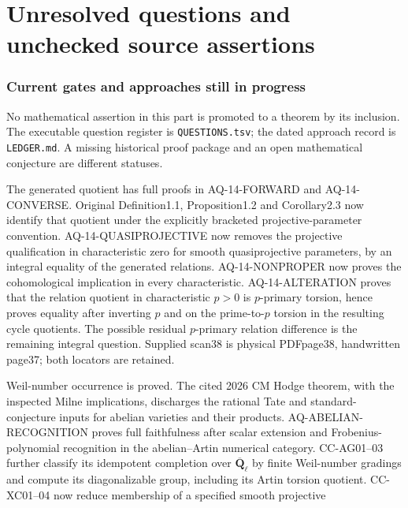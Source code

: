 \documentclass[11pt,a4paper]{article}
\theoremstyle{definition}\newtheorem{definition}[theorem]{Definition}
\theoremstyle{remark}\newtheorem{remark}[theorem]{Remark}
\begin{document}
\clearpage
\part{Unresolved questions and unchecked source assertions}
\section{Current gates and approaches still in progress}
No mathematical assertion in this part is promoted to a theorem by
its inclusion. The executable question register is \nolinkurl{QUESTIONS.tsv};
the dated approach record is \nolinkurl{LEDGER.md}. A missing historical
proof package and an open mathematical conjecture are different statuses.

\begin{description}[style=nextline,leftmargin=0pt,labelwidth=0pt,labelsep=0pt]
\item[Cote 14, scans 25--38: original quotient identification.]
The generated quotient has full proofs in AQ-14-FORWARD and
AQ-14-CONVERSE. Original Definition1.1, Proposition1.2 and
Corollary2.3 now identify that quotient under the explicitly bracketed
projective-parameter convention. AQ-14-QUASIPROJECTIVE now removes the projective qualification
in characteristic zero for smooth quasiprojective parameters, by an
integral equality of the generated relations. AQ-14-NONPROPER now
proves the cohomological implication in every characteristic.
AQ-14-ALTERATION proves that the relation quotient in characteristic
$p>0$ is $p$-primary torsion, hence proves equality after inverting $p$
and on the prime-to-$p$ torsion in the resulting cycle quotients.
The possible residual $p$-primary relation difference is the remaining
integral question. Supplied scan38 is physical PDFpage38,
handwritten page37; both locators are retained.
\item[Cote 15, scans 100--106: full simple-motive classification.]
Weil-number occurrence is proved. The cited 2026 CM Hodge theorem,
with the inspected Milne implications, discharges the rational Tate and
standard-conjecture inputs for abelian varieties and their products.
AQ-ABELIAN-RECOGNITION proves full faithfulness after scalar extension
and Frobenius-polynomial recognition in the abelian--Artin numerical
category. CC-AG01--03 further classify its idempotent completion over
$\overline{\mathbf Q}_\ell$ by finite Weil-number gradings and
compute its diagonalizable group, including its Artin torsion quotient. CC-XC01--04 now reduce membership of a specified smooth projective

\end{description}
\end{document}
